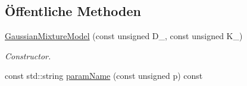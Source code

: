 \subsection*{Öffentliche Methoden}
\begin{DoxyCompactItemize}
\item 
\hyperlink{classCDA_1_1GaussianMixtureModel_a5921b8eb76badb1c21f18da585fde8ce}{GaussianMixtureModel} (const unsigned D\_\-, const unsigned K\_\-)
\begin{DoxyCompactList}\small\item\em Constructor. \item\end{DoxyCompactList}\item 
\hypertarget{classCDA_1_1GaussianMixtureModel_ace9d6f0ae0c45734c78be74b2c15d36b}{
const std::string \hyperlink{classCDA_1_1GaussianMixtureModel_ace9d6f0ae0c45734c78be74b2c15d36b}{paramName} (const unsigned p) const }
\label{classCDA_1_1GaussianMixtureModel_ace9d6f0ae0c45734c78be74b2c15d36b}


\end{DoxyCompactItemize}
